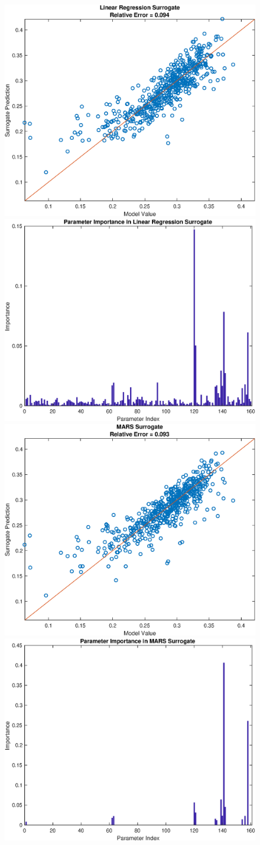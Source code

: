 \documentclass[12pt]{article}
\numberwithin{equation}{section}
\begin{document}
\begin{figure}[h]
\centering
\includegraphics[width=.49 \textwidth]{Figures/AM_AMp_Min_QoI_LR_Prediction_Experimental.eps}
\includegraphics[width=.49 \textwidth]{Figures/AM_AMp_Min_QoI_LR_VI_Experimental.eps}\\
\includegraphics[width=.49 \textwidth]{Figures/AM_AMp_Min_QoI_MARS_Prediction_Experimental.eps}
\includegraphics[width=.49 \textwidth]{Figures/AM_AMp_Min_QoI_MARS_VI_Experimental.eps}
\end{figure}
\end{document}
